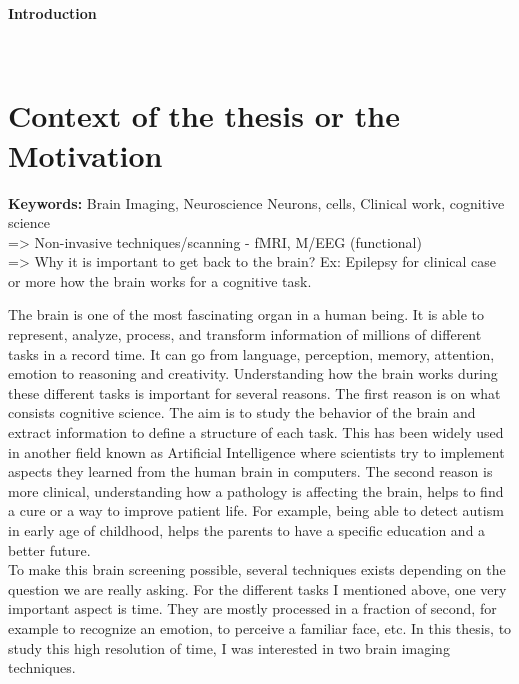 

\newpage

{\huge\textbf{Introduction}\par}
\HRule \\[0.4cm] %
\section*{Context of the thesis or the Motivation}
\textbf{Keywords:} Brain Imaging, Neuroscience Neurons, cells, Clinical work, cognitive science\\
=> Non-invasive techniques/scanning - fMRI, M/EEG (functional)\\
=> Why it is important to get back to the brain? Ex: Epilepsy for clinical case or more how the brain works for a cognitive task.

The brain is one of the most fascinating organ in a human being. It is able to represent, analyze, process, and transform information of millions of different tasks in a record time. It can go from language, perception, memory, attention, emotion to reasoning and creativity. Understanding how the brain works during these different tasks is important for several reasons. The first reason is on what consists cognitive science. The aim is to study the behavior of the brain and extract information to define a structure of each task. This has been widely used in another field known as  Artificial Intelligence where scientists try to implement aspects they learned from the human brain in computers. The second reason is more clinical, understanding how a pathology is affecting the brain, helps to find a cure or a way to improve patient life. For example, being able to detect autism in early age of childhood, helps the parents to have a specific education and a better future.\\

To make this brain screening possible, several techniques exists depending on the question we are really asking. For the different tasks I mentioned above, one very important aspect is time. They are mostly processed in a fraction of second, for example to recognize an emotion, to perceive a familiar face, etc. In this thesis, to study this high resolution of time, I was interested in two brain imaging techniques.\\

